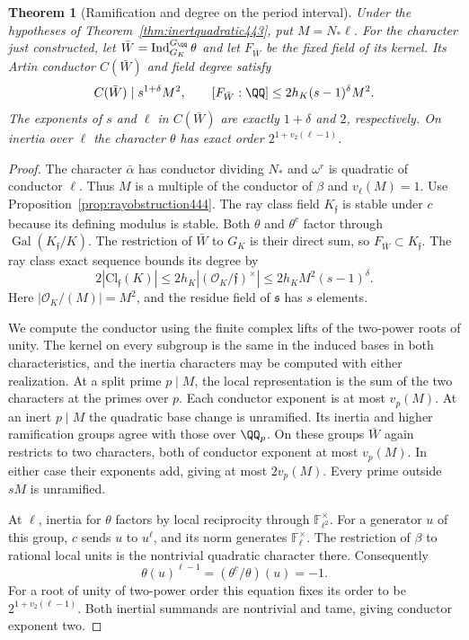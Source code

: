 \documentclass[a4paper,11pt]{article}
\newtheorem{theorem}[proposition]{Theorem}
\theoremstyle{definition}
\theoremstyle{remark}
\numberwithin{equation}{section}
\begin{document}
\begin{theorem}[Ramification and degree on the period interval]\leavevmode
\label{thm:rayconductor444}
Under the hypotheses of Theorem~\ref{thm:inertquadratic443},
put \(M=N_*\ell\). For the character just constructed, let
\(\bar W=\operatorname{Ind}_{G_K}^{G_\QQ}\theta\) and let
\(F_{\bar W}\) be the fixed field of its kernel. Its Artin conductor \(C(\bar W)\)
and field degree satisfy
\[
      C(\bar W)\mid s^{1+\delta}M^2,\qquad
      [F_{\bar W}:\QQ]\le 2 h_K(s-1)^\delta M^2 .
\]
The exponents of \(s\) and \(\ell\) in \(C(\bar W)\) are exactly
\(1+\delta\) and \(2\), respectively. On inertia over \(\ell\)
the character \(\theta\) has exact order
\(2^{1+v_2(\ell-1)}\).
\end{theorem}
\begin{proof}
The character \(\bar\alpha\) has conductor dividing \(N_*\) and
\(\omega^r\) is quadratic of conductor \(\ell\). Thus \(M\) is
a multiple of the conductor of \(\beta\) and
\(v_\ell(M)=1\). Use Proposition~\ref{prop:rayobstruction444}.
The ray class field \(K_{\mathfrak f}\) is stable under \(c\)
because its defining modulus is stable. Both \(\theta\) and
\(\theta^c\) factor through \(\operatorname{Gal}(K_{\mathfrak f}/K)\).
The restriction of \(\bar W\) to \(G_K\) is their direct sum,
so \(F_{\bar W}\subset K_{\mathfrak f}\). The ray class exact
sequence bounds its degree by
\[
     2|\mathrm{Cl}_{\mathfrak f}(K)|
       \le 2h_K|(\mathcal O_K/\mathfrak f)^\times|
       \le 2h_K M^2(s-1)^\delta .
\]
Here \(|\mathcal O_K/(M)|=M^2\), and the residue field of
\(\mathfrak s\) has \(s\) elements.

We compute the conductor using the finite complex lifts of
the two-power roots of unity. The kernel on every subgroup is
the same in the induced bases in both characteristics, and the
inertia characters may be computed with either realization.
At a split prime \(p\mid M\), the local representation is the
sum of the two characters at the primes over \(p\). Each
conductor exponent is at most \(v_p(M)\). At an inert
\(p\mid M\) the quadratic base change is unramified. Its
inertia and higher ramification groups agree with those over
\(\QQ_p\). On these groups \(\bar W\) again restricts to two
characters, both of conductor exponent at most \(v_p(M)\).
In either case their exponents add, giving at most \(2v_p(M)\).
Every prime outside \(sM\) is unramified.

At \(\ell\), inertia for \(\theta\) factors by local reciprocity
through \(\mathbb F_{\ell^2}^\times\). For a generator \(u\)
of this group, \(c\) sends \(u\) to \(u^\ell\), and its norm
generates \(\mathbb F_\ell^\times\). The restriction of
\(\beta\) to rational local units is the nontrivial quadratic
character there. Consequently
\[
              \theta(u)^{\ell-1}
               =(\theta^c/\theta)(u)=-1 .
\]
For a root of unity of two-power order this equation fixes its
order to be \(2^{1+v_2(\ell-1)}\). Both inertial summands are
nontrivial and tame, giving conductor exponent two.


\end{proof}
\end{document}
